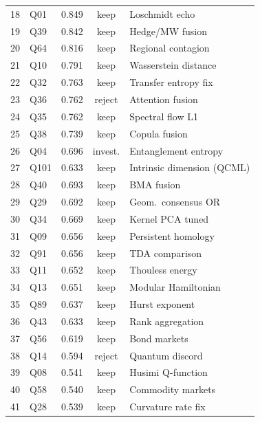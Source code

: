 \documentclass[11pt,a4paper]{article}
\begin{document}
\begin{table}[H]
\begin{tabular}{@{}rlccl@{}}
18 & Q01 & 0.849 & \cellcolor{keepgreen!30}keep & Loschmidt echo \\
19 & Q39 & 0.842 & \cellcolor{keepgreen!30}keep & Hedge/MW fusion \\
20 & Q64 & 0.816 & \cellcolor{keepgreen!30}keep & Regional contagion \\
21 & Q10 & 0.791 & \cellcolor{keepgreen!30}keep & Wasserstein distance \\
22 & Q32 & 0.763 & \cellcolor{keepgreen!30}keep & Transfer entropy fix \\
23 & Q36 & 0.762 & \cellcolor{rejectred!30}reject & Attention fusion \\
24 & Q35 & 0.762 & \cellcolor{keepgreen!30}keep & Spectral flow L1 \\
25 & Q38 & 0.739 & \cellcolor{keepgreen!30}keep & Copula fusion \\
26 & Q04 & 0.696 & \cellcolor{keepgreen!30}invest. & Entanglement entropy \\
27 & Q101 & 0.633 & \cellcolor{keepgreen!30}keep & Intrinsic dimension (QCML) \\
28 & Q40 & 0.693 & \cellcolor{keepgreen!30}keep & BMA fusion \\
29 & Q29 & 0.692 & \cellcolor{keepgreen!30}keep & Geom.\ consensus OR \\
30 & Q34 & 0.669 & \cellcolor{keepgreen!30}keep & Kernel PCA tuned \\
31 & Q09 & 0.656 & \cellcolor{keepgreen!30}keep & Persistent homology \\
32 & Q91 & 0.656 & \cellcolor{keepgreen!30}keep & TDA comparison \\
33 & Q11 & 0.652 & \cellcolor{keepgreen!30}keep & Thouless energy \\
34 & Q13 & 0.651 & \cellcolor{keepgreen!30}keep & Modular Hamiltonian \\
35 & Q89 & 0.637 & \cellcolor{keepgreen!30}keep & Hurst exponent \\
36 & Q43 & 0.633 & \cellcolor{keepgreen!30}keep & Rank aggregation \\
37 & Q56 & 0.619 & \cellcolor{keepgreen!30}keep & Bond markets \\
38 & Q14 & 0.594 & \cellcolor{rejectred!30}reject & Quantum discord \\
39 & Q08 & 0.541 & \cellcolor{keepgreen!30}keep & Husimi Q-function \\
40 & Q58 & 0.540 & \cellcolor{keepgreen!30}keep & Commodity markets \\
41 & Q28 & 0.539 & \cellcolor{keepgreen!30}keep & Curvature rate fix \\

\end{tabular}
\end{table}
\end{document}
